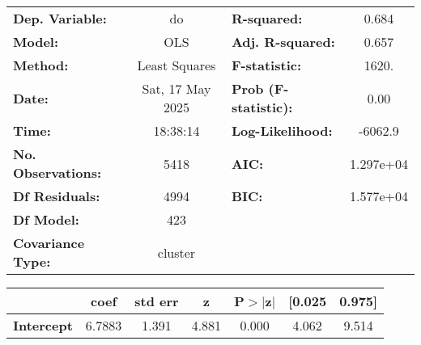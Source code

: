 \begin{center}
\begin{tabular}{lclc}
\toprule
\textbf{Dep. Variable:}                                                                             &        do        & \textbf{  R-squared:         } &     0.684   \\
\textbf{Model:}                                                                                     &       OLS        & \textbf{  Adj. R-squared:    } &     0.657   \\
\textbf{Method:}                                                                                    &  Least Squares   & \textbf{  F-statistic:       } &     1620.   \\
\textbf{Date:}                                                                                      & Sat, 17 May 2025 & \textbf{  Prob (F-statistic):} &     0.00    \\
\textbf{Time:}                                                                                      &     18:38:14     & \textbf{  Log-Likelihood:    } &   -6062.9   \\
\textbf{No. Observations:}                                                                          &        5418      & \textbf{  AIC:               } & 1.297e+04   \\
\textbf{Df Residuals:}                                                                              &        4994      & \textbf{  BIC:               } & 1.577e+04   \\
\textbf{Df Model:}                                                                                  &         423      & \textbf{                     } &             \\
\textbf{Covariance Type:}                                                                           &     cluster      & \textbf{                     } &             \\
\bottomrule
\end{tabular}
\begin{tabular}{lcccccc}
                                                                                                    & \textbf{coef} & \textbf{std err} & \textbf{z} & \textbf{P$> |$z$|$} & \textbf{[0.025} & \textbf{0.975]}  \\
\midrule
\textbf{Intercept}                                                                                  &       6.7883  &        1.391     &     4.881  &         0.000        &        4.062    &        9.514     \\

\end{tabular}
\end{center}
